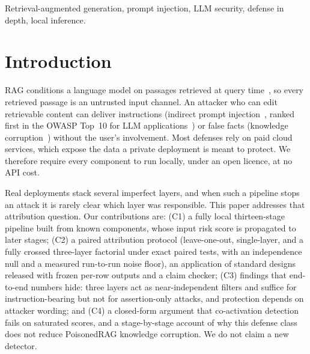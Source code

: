 \documentclass[conference,a4paper]{IEEEtran}
\begin{document}
\begin{IEEEkeywords}
Retrieval-augmented generation, prompt injection, LLM security, defense in depth, local inference.
\end{IEEEkeywords}

\section{Introduction}
RAG conditions a language model on passages retrieved at query time~\cite{lewis2020rag}, so every retrieved passage is an untrusted input channel. An attacker who can edit retrievable content can deliver instructions (indirect prompt injection~\cite{greshake2023}, ranked first in the OWASP Top~10 for LLM applications~\cite{owasp2025}) or false facts (knowledge corruption~\cite{zou2025poisonedrag}) without the user's involvement. Most defenses rely on paid cloud services, which expose the data a private deployment is meant to protect. We therefore require every component to run locally, under an open licence, at no API cost.

Real deployments stack several imperfect layers, and when such a pipeline stops an attack it is rarely clear which layer was responsible. This paper addresses that attribution question. Our contributions are: (C1) a fully local thirteen-stage pipeline built from known components, whose input risk score is propagated to later stages; (C2) a paired attribution protocol (leave-one-out, single-layer, and a fully crossed three-layer factorial under exact paired tests, with an independence null and a measured run-to-run noise floor), an application of standard designs~\cite{fawcett2016ablation,hutter2014fanova} released with frozen per-row outputs and a claim checker; (C3) findings that end-to-end numbers hide: three layers act as near-independent filters and suffice for instruction-bearing but not for assertion-only attacks, and protection depends on attacker wording; and (C4) a closed-form argument that co-activation detection fails on saturated scores, and a stage-by-stage account of why this defense class does not reduce PoisonedRAG knowledge corruption. We do not claim a new detector.
\end{document}
